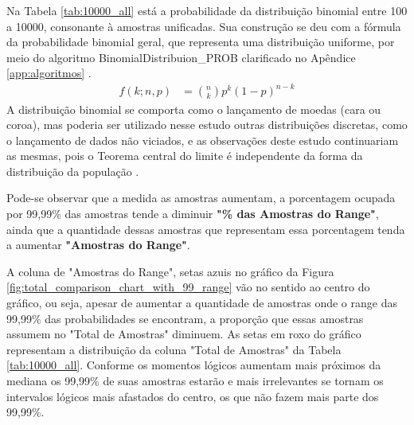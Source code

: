 Na Tabela \ref{tab:10000_all} está a probabilidade da distribuição binomial entre 100 a 10000, consonante à amostras unificadas. Sua construção se deu com a fórmula da probabilidade binomial geral, que representa uma distribuição uniforme, por meio do algoritmo BinomialDistribuion\_PROB clarificado no Apêndice \ref{app:algoritmos} \cite{mathisfun_binomial_distribution}.
\begin{align*}
f(k;n,p) &= \binom{n}{k} p^k(1 - p)^{n-k}
\end{align*}
A distribuição binomial se comporta como o lançamento de moedas (cara ou coroa), mas poderia ser utilizado nesse estudo outras distribuições discretas, como o lançamento de dados não viciados, e as observações deste estudo continuariam as mesmas, pois o Teorema central do limite é independente da forma da distribuição da população \cite{statisticsbyjim_central_limite_theorem_explainded}.

Pode-se observar que a medida as amostras aumentam, a porcentagem ocupada por 99,99\% das amostras tende a diminuir \textbf{"\% das Amostras do Range"}, ainda que a quantidade dessas amostras que representam essa porcentagem tenda a aumentar \textbf{"Amostras do Range"}.

A coluna de "Amostras do Range", setas azuis no gráfico da Figura \ref{fig:total_comparison_chart_with_99_range} vão no sentido ao centro do gráfico, ou seja, apesar de aumentar a quantidade de amostras onde o range das 99,99\% das probabilidades se encontram, a proporção que essas amostras assumem no "Total de Amostras" diminuem. As setas em roxo do gráfico representam a distribuição da coluna "Total de Amostras" da Tabela \ref{tab:10000_all}. Conforme os momentos lógicos aumentam mais próximos da mediana os 99,99\% de suas amostras estarão e mais irrelevantes se tornam os intervalos lógicos mais afastados do centro, os que não fazem mais parte dos 99,99\%.

